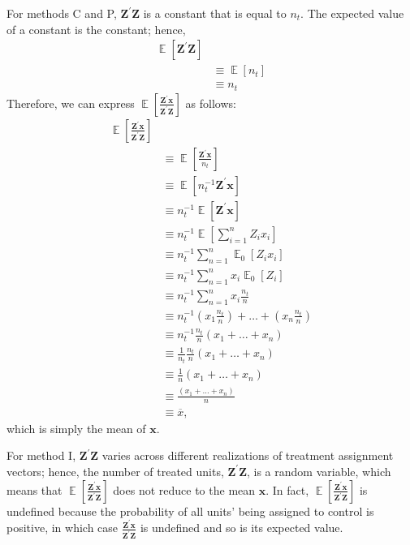 \documentclass[11pt]{article}\usepackage[]{graphicx}\usepackage[]{color}
\theoremstyle{newstyle}
\DeclareMathOperator{\E}{\mathbb{E}}
\begin{document}
For methods C and P, $\mathbf{Z}^{\prime}\mathbf{Z}$ is a constant that is equal to $n_t$. The expected value of a constant is the constant; hence,
\begin{align*}
\E\left[\mathbf{Z}^{\prime}\mathbf{Z}\right] \\
& \equiv \E\left[n_t\right] \\
& \equiv n_t
\end{align*}
Therefore, we can express $\E\left[\frac{\mathbf{Z}^{\prime}\mathbf{x}}{\mathbf{Z}^{\prime}\mathbf{Z}}\right]$ as follows:
\begin{align*}
\E\left[\frac{\mathbf{Z}^{\prime}\mathbf{x}}{\mathbf{Z}^{\prime}\mathbf{Z}}\right] \\
& \equiv \E\left[\frac{\mathbf{Z}^{\prime}\mathbf{x}}{n_t}\right] \\
& \equiv \E\left[n_t^{-1}\mathbf{Z}^{\prime}\mathbf{x}\right] \\
& \equiv n_t^{-1} \E\left[\mathbf{Z}^{\prime}\mathbf{x}\right] \\
& \equiv n_t^{-1} \E\left[\sum \limits_{i = 1}^n Z_i x_i\right] \\
& \equiv n_t^{-1} \sum \limits_{n = 1}^n \E_0\left[Z_i x_i\right]  \\
& \equiv n_t^{-1} \sum \limits_{n = 1}^n x_i \E_0\left[Z_i\right]  \\
& \equiv n_t^{-1} \sum \limits_{n = 1}^n x_i \frac{n_t}{n} \\
& \equiv n_t^{-1}  \left(x_{1} \frac{n_t}{n}\right) + \dots + \left(x_n \frac{n_t}{n}\right)  \\
& \equiv n_t^{-1} \frac{n_t}{n} \left(x_1 + \dots + x_n\right) \\
& \equiv \frac{1}{n_t} \frac{n_t}{n} \left(x_1 + \dots + x_n\right)  \\
& \equiv \frac{1}{n} \left(x_1 + \dots + x_n\right)  \\
& \equiv \frac{\left(x_1 + \dots + x_n\right)}{n} \\
& \equiv \overline{x},
\end{align*}
which is simply the mean of $\mathbf{x}$.

For method I, $\mathbf{Z}^{\prime}\mathbf{Z}$ varies across different realizations of treatment assignment vectors; hence, the number of treated units, $\mathbf{Z}^{\prime}\mathbf{Z}$, is a random variable, which means that $\E\left[\frac{\mathbf{Z}^{\prime}\mathbf{x}}{\mathbf{Z}^{\prime}\mathbf{Z}}\right]$ does not reduce to the mean $\mathbf{x}$. In fact, $\E\left[\frac{\mathbf{Z}^{\prime}\mathbf{x}}{\mathbf{Z}^{\prime}\mathbf{Z}}\right]$ is undefined because the probability of all units' being assigned to control is positive, in which case $\frac{\mathbf{Z}^{\prime}\mathbf{x}}{\mathbf{Z}^{\prime}\mathbf{Z}}$ is undefined and so is its expected value.


\newpage

\begin{singlespace}

\end{singlespace}
\end{document}
